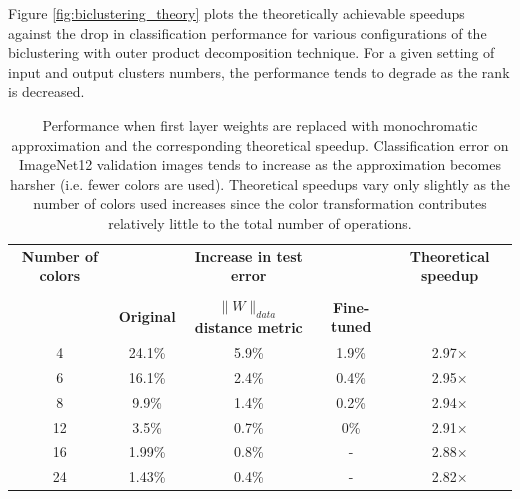 \documentclass{article} %
\begin{document}
Figure \ref{fig:biclustering_theory} plots the theoretically achievable speedups against the drop in classification performance for various configurations of the biclustering with outer product decomposition technique.  
For a given setting of input and output clusters numbers, the performance tends to degrade as the rank is decreased. 

\begin{table}[t]
\small
\centering
\begin{tabular}{ccccc}
\hline
{\bf Number of colors} & & {\bf Increase in test error} & & {\bf Theoretical speedup}\\
& & & &\\
& {\bf Original} & {\bf $\|W\|_{data}$ distance metric} & {\bf Fine-tuned} & \\
\hline
4 & 24.1\% & 5.9\% & 1.9\% & 2.97$\times$ \\
6 & 16.1\% & 2.4\% & 0.4\% & 2.95$\times$ \\
8 & 9.9\% & 1.4\% & 0.2\% & 2.94$\times$\\
12 & 3.5\% & 0.7\% & 0\% & 2.91$\times$\\
16 & 1.99\% & 0.8\% & - & 2.88$\times$\\
24 & 1.43\% & 0.4\% & - & 2.82$\times$\\
\hline 
\end{tabular}
\caption{Performance when first layer weights are replaced with monochromatic approximation and the corresponding theoretical speedup. Classification error on ImageNet12 validation images tends to increase as the approximation becomes harsher (i.e. fewer colors are used). Theoretical speedups vary only slightly as the number of colors used increases since the color transformation contributes relatively little to the total number of operations.} 
\label{table:mono_perf}
\end{table}
\nocite{*}


\end{document}
